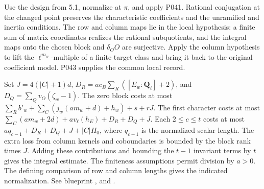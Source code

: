 \begin{outline}
Use the design from 5.1, normalize at \(\pi\), and apply P041. Rational conjugation at the changed point preserves the characteristic coefficients and the unramified and inertia conditions. The row and column maps lie in the local hypothesis: a finite sum of matrix coordinates realizes the rational subquotients, and the integral maps onto the chosen block and \(\delta_O O\) are surjective. Apply the column hypothesis to lift the \(\ell^{m_w}\)-multiple of a finite target class and bring it back to the original coefficient model. P043 supplies the common local record.

Set \(J=4(|C|+1)d\), \(D_R=ac_B\sum_R([E_w:\mathbf Q_\ell]+2)\), and \(D_Q=\sum_Qv_O(\zeta_w-1)\). The zero block costs at most
\(\sum_R b'_w+\sum_C(j_w(a m_w+d)+h_w)+s+rJ\).
The first character costs at most \(\sum_C(a m_w+2d)+a v_\ell(h_E)+D_R+D_Q+J\). Each \(2\le c\le t\) costs at most \(a q_{c-1}+D_R+D_Q+J+|C|H_0\), where \(q_{c-1}\) is the normalized scalar length. The extra loss from column kernels and coboundaries is bounded by the block rank times \(J\). Adding these contributions and bounding the \(t-1\) invariant terms by \(t\) gives the integral estimate. The finiteness assumptions permit division by \(a>0\). The defining comparison of row and column lengths gives the indicated normalization. See blueprint ,  and .
\end{outline}
